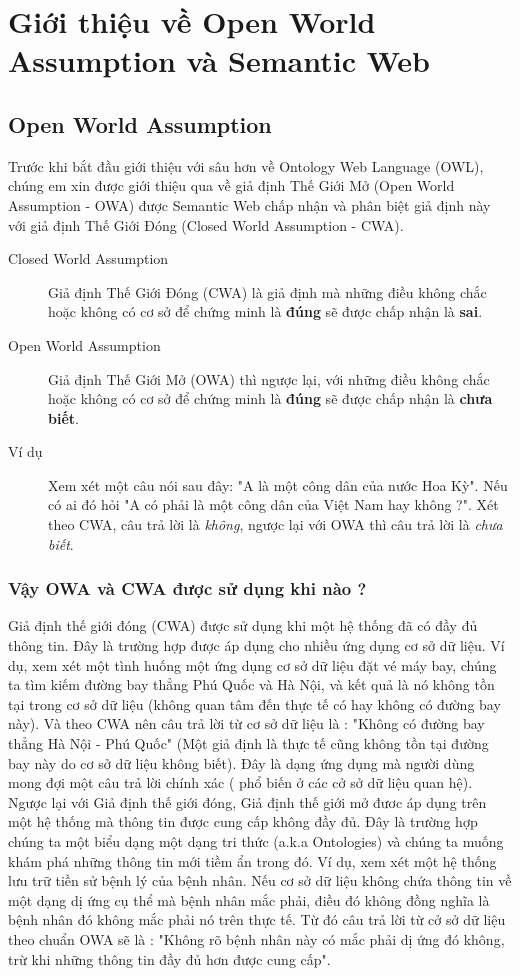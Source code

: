 \chapter{Giới thiệu về Open World Assumption và Semantic Web}
\section{Open World Assumption}
Trước khi bắt đầu giới thiệu với sâu hơn về Ontology Web Language (OWL), chúng em xin được giới thiệu qua về giả định Thế Giới Mở (Open World Assumption - OWA)\cite{OWA_0} được Semantic Web chấp nhận và phân biệt giả định này với giả định Thế Giới Đóng (Closed World Assumption - CWA).
\begin{description}
\item[Closed World Assumption] 
Giả định Thế Giới Đóng (CWA) là giả định mà những điều không chắc hoặc không có cơ sở để chứng minh là \textbf{đúng} sẽ được chấp nhận là \textbf{sai}.
\item[Open World Assumption]
Giả định Thế Giới Mở (OWA) thì ngược lại, với những điều không chắc hoặc không có cơ sở để chứng minh là \textbf{đúng} sẽ được chấp nhận là \textbf{chưa biết}. 
\item[Ví dụ]
Xem xét một câu nói sau đây: "A là một công dân của nước Hoa Kỳ". Nếu có ai đó hỏi "A có phải là một công dân của Việt Nam hay không ?". Xét theo CWA, câu trả lời là \textit{không}, ngược lại với OWA thì câu trả lời là \textit{chưa biết}. 
\end{description}
\subsection{Vậy OWA và CWA được sử dụng khi nào ?}
Giả định thế giới đóng (CWA) được sử dụng khi một hệ thống đã có đầy đủ thông tin. Đây là trường hợp được áp dụng cho nhiều ứng dụng cơ sở dữ liệu. Ví dụ, xem xét một tình huống một ứng dụng cơ sở dữ liệu đặt vé máy bay, chúng ta tìm kiếm đường bay thẳng Phú Quốc và Hà Nội, và kết quả là nó không tồn tại trong cơ sở dữ liệu (không quan tâm đến thực tế có hay không có đường bay này). Và theo CWA nên câu trả lời từ cơ sở dữ liệu là : "Không có đường bay thẳng Hà Nội - Phú Quốc" (Một giả định là thực tế cũng không tồn tại đường bay này do cơ sở dữ liệu không biết). Đây là dạng ứng dụng mà người dùng mong đợi một câu trả lời chính xác ( phổ biến ở các cở sở dữ liệu quan hệ).
\\Ngược lại với Giả định thế giới đóng, Giả định thế giới mở đươc áp dụng trên một hệ thống mà thông tin được cung cấp không đầy đủ. Đây là trường hợp chúng ta một biểu dạng một dạng tri thức (a.k.a Ontologies) và chúng ta muống khám phá những thông tin mới tiềm ẩn trong đó. Ví dụ, xem xét một hệ thống lưu trữ tiền sử bệnh lý của bệnh nhân. Nếu cơ sở dữ liệu không chứa thông tin về một dạng dị ứng cụ thể mà bệnh nhân mắc phải, điều đó không đồng nghĩa là bệnh nhân đó không mắc phải nó trên thực tế. Từ đó câu trả lời từ cở sở dữ liệu theo chuẩn OWA sẽ là : "Không rõ bệnh nhân này có mắc phải dị ứng đó không, trừ khi những thông tin đầy đủ hơn được cung cấp".
